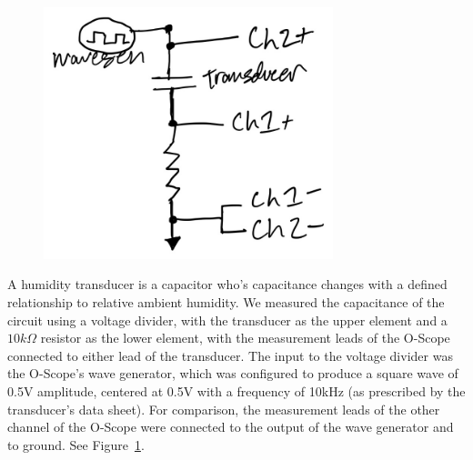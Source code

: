 \documentclass[11pt]{article}
\begin{document}
\begin{figure} [H]

	\centering  %
	
	\includegraphics[width=0.75\textwidth]{circuit_diagram.jpg}
	
	
	\caption{}
	
	\label{fig:circuit}
\end{figure}

A humidity transducer is a capacitor who's capacitance changes with a defined relationship to relative ambient humidity. We measured the capacitance of the circuit using a voltage divider, with the transducer as the upper element and a $10k\Omega$ resistor as the lower element, with the measurement leads of the O-Scope connected to either lead of the transducer. The input to the voltage divider was the O-Scope's wave generator, which was configured to produce a square wave of 0.5V amplitude, centered at 0.5V with a frequency of 10kHz (as prescribed by the transducer's data sheet). For comparison, the measurement leads of the other channel of the O-Scope were connected to the output of the wave generator and to ground. See Figure~\ref{fig:circuit}.
\end{document}
